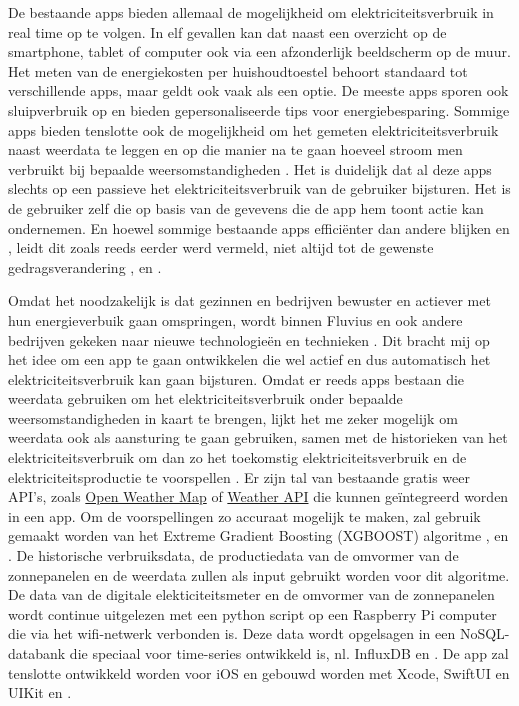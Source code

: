 \documentclass{hogent-article}
\begin{document}
De bestaande apps bieden allemaal de mogelijkheid om elektriciteitsverbruik in real time op te volgen. In elf gevallen kan dat naast een overzicht op de smartphone, tablet of computer ook via een afzonderlijk beeldscherm op de muur. Het meten van de energiekosten per huishoudtoestel behoort standaard tot verschillende apps, maar geldt ook vaak als een optie. De meeste apps sporen ook sluipverbruik op en bieden gepersonaliseerde tips voor energiebesparing. Sommige apps bieden tenslotte ook de mogelijkheid om het gemeten elektriciteitsverbruik naast weerdata te leggen en op die manier na te gaan hoeveel stroom men verbruikt bij bepaalde weersomstandigheden \autocite{Deman2021}. Het is duidelijk dat al deze apps slechts op een passieve het elektriciteitsverbruik van de gebruiker bijsturen. Het is de gebruiker zelf die op basis van de gevevens die de app hem toont actie kan ondernemen. En hoewel sommige bestaande apps efficiënter dan andere blijken \autocite{Mack2016} en \autocite{Wood2019}, leidt dit zoals reeds eerder werd vermeld, niet altijd tot de gewenste gedragsverandering \autocite{Wemyss2019}, \autocite{Mack2019} en  \autocite{VREG2021}.

Omdat het noodzakelijk is dat gezinnen en bedrijven bewuster en actiever met hun energieverbuik gaan omspringen, wordt binnen Fluvius en ook andere bedrijven gekeken naar nieuwe technologieën en technieken \autocite{Verdoodt2018}. Dit bracht mij op het idee om een app te gaan ontwikkelen die wel actief en dus automatisch het elektriciteitsverbruik kan gaan bijsturen. Omdat er reeds apps bestaan die weerdata gebruiken om het elektriciteitsverbruik onder bepaalde weersomstandigheden in kaart te brengen, lijkt het me zeker mogelijk om weerdata ook als aansturing te gaan gebruiken, samen met de historieken van het elektriciteitsverbruik om dan zo het toekomstig elektriciteitsverbruik en de elektriciteitsproductie te voorspellen \autocite{Guo2022}. Er zijn tal van bestaande gratis weer API's, zoals \href{https://openweathermap.org/api}{Open Weather Map} of \href{https://www.weatherapi.com/}{Weather API} die kunnen geïntegreerd worden in een app. Om de voorspellingen zo accuraat mogelijk te maken, zal gebruik gemaakt worden van het Extreme Gradient Boosting (XGBOOST) algoritme \autocite{Ledmaoui2023}, \autocite{Wang2022} en \autocite{BarreraAnimas2022}. De historische verbruiksdata, de productiedata van de omvormer van de zonnepanelen en de weerdata zullen als input gebruikt worden voor dit algoritme. De data van de digitale elekticiteitsmeter en de omvormer van de zonnepanelen wordt continue uitgelezen met een python script op een Raspberry Pi computer die via het wifi-netwerk verbonden is. Deze data wordt opgelsagen in een NoSQL-databank die speciaal voor time-series ontwikkeld is, nl. InfluxDB \autocite{Balis2017} en  \autocite{Struckov2019}. De app zal tenslotte ontwikkeld worden voor iOS en gebouwd worden met Xcode, SwiftUI en UIKit \autocite{Allardice} en \autocite{Firtman2022}.
\end{document}
